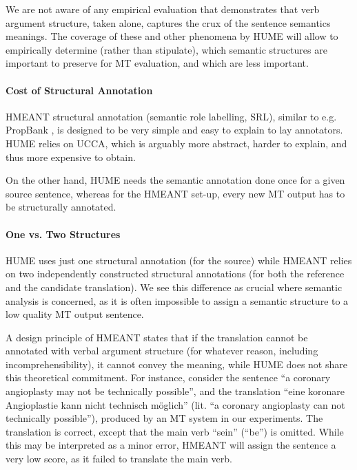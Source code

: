\documentclass[11pt]{article}
\newcommand{\oa}[1]{}
\def\parcite#1{\cite{#1}}
\begin{document}
We are not aware of any empirical evaluation that demonstrates that verb argument structure,
taken alone, captures the crux of the sentence semantics meanings.
The coverage of
these and other phenomena by HUME will allow to empirically determine 
(rather than stipulate), which semantic structures are important
to preserve for MT evaluation, and which are less important.




\paragraph{Cost of Structural Annotation}

HMEANT structural annotation (semantic role labelling, SRL), similar to e.g.
PropBank
\parcite{palmer2010semantic}, is designed to be very simple and easy to explain
to lay annotators.
HUME relies on UCCA, which is arguably more abstract, harder to
explain, and thus more expensive to obtain.

On the other hand, HUME 
needs the semantic annotation
done once for a given source sentence, whereas for the HMEANT set-up, every new
MT output has to be structurally annotated.\oa{we can give some empirical data here.
  In the WMT 13 experiment, Lexi and Barry report a little over 3 mins of annotation
  per sentence + 3 translations. HUME annotation is about 2-4 minutes per sentence.
  UCCA annotation by trained annotators is about 700 tokens/hour (we didn't
  check it for individual sentences), but that's done only once so it should be amortized.}

\paragraph{One vs. Two Structures}

HUME uses just one structural annotation (for the source) while HMEANT relies on
two independently constructed structural annotations (for both the reference and
the candidate translation).
We see this difference as crucial where semantic analysis is concerned, as it
is often impossible to assign a semantic structure to a low quality MT output sentence.

A design principle of HMEANT states that
if the translation cannot be annotated with verbal argument structure
(for whatever reason, including incomprehensibility), it cannot convey the meaning,
while HUME does not share this theoretical commitment.
For instance, consider the sentence ``a coronary angioplasty may not be technically possible'',
and the translation ``eine koronare Angioplastie kann nicht technisch m{\"o}glich''
(lit. ``a coronary angioplasty can not technically possible''),
produced by an MT system in our experiments.
The translation is correct, except that the main verb ``sein'' (``be'') is omitted.
While this may be interpreted as a minor error, HMEANT will assign the
sentence a very low score, as it failed to translate the main verb.
\end{document}
